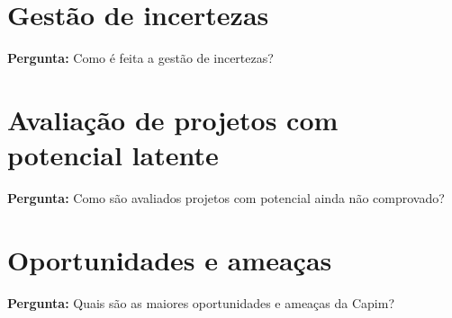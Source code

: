 \begin{apendicesenv}
\section{Gestão de incertezas}
\textbf{Pergunta:} Como é feita a gestão de incertezas?

\section{Avaliação de projetos com potencial latente}
\textbf{Pergunta:} Como são avaliados projetos com potencial ainda não comprovado?

\section{Oportunidades e ameaças}
\textbf{Pergunta:} Quais são as maiores oportunidades e ameaças da Capim?

\end{apendicesenv}
